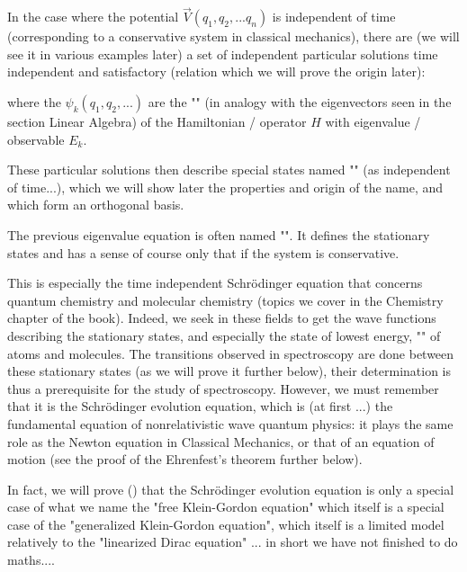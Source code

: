 	In the case where the potential $\vec{V}(q_1,q_2,...q_n)$ is independent of time (corresponding to a conservative system in classical mechanics), there are (we will see it in various  examples later) a set of independent particular solutions time independent and satisfactory (relation which we will prove the origin later):
	
	where the $\psi_k(q_1,q_2,...)$ are the "" (in analogy with the eigenvectors seen in the section Linear Algebra) of the Hamiltonian / operator $H$ with eigenvalue / observable $E_k$.
	
	These particular solutions then describe special states named "" (as independent of time...), which we will show later the properties and origin of the name, and which form an orthogonal basis.
	
	The previous eigenvalue equation is often named "". It defines the stationary states and has a sense of course only that if the system is conservative.
	
	This is especially the time independent Schrödinger equation that concerns quantum chemistry and molecular chemistry (topics we cover in the Chemistry chapter of the book). Indeed, we seek in these fields to get the wave functions describing the stationary states, and especially the state of lowest energy, "" of atoms and molecules. The transitions observed in spectroscopy are done between these stationary states (as we will prove it further below), their determination is thus a prerequisite for the study of spectroscopy. However, we must remember that it is the Schrödinger evolution equation, which is (at first ...) the fundamental equation of nonrelativistic wave quantum physics: it plays the same role as the Newton equation in Classical Mechanics, or that of an equation of motion (see the proof of the  Ehrenfest's theorem further below).
	\begin{tcolorbox}[title=Remark,colframe=black,arc=10pt]
	In fact, we will prove () that the Schrödinger evolution equation is only a special case of what we name the "free Klein-Gordon equation" which itself is a special case of the "generalized Klein-Gordon equation", which itself is a limited model relatively to the "linearized Dirac equation" ... in short we have not finished to do maths....
	\end{tcolorbox}
	
